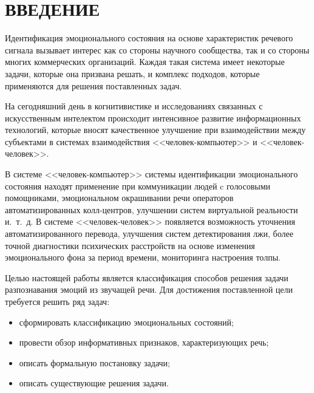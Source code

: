 \chapter*{ВВЕДЕНИЕ}

Идентификация эмоционального состояния на основе характеристик речевого сигнала вызывает интерес как со стороны научного сообщества, так и со стороны многих коммерческих организаций. Каждая такая система имеет некоторые задачи, которые она призвана решать, и комплекс подходов, которые применяются для решения поставленных задач.

На сегодняшний день в когнитивистике и исследованиях связанных с искусственным интелектом происходит интенсивное развитие информационных технологий, которые вносят качественное улучшение при взаимодействии между субъектами в системах взаимодействия <<человек-компьютер>> и <<человек-человек>>. 

В системе <<человек-компьютер>> системы идентификации эмоционального состояния находят применение при коммуникации людей c голосовыми помощниками, эмоциональном окрашивании речи операторов автоматизированных колл-центров, улучшении систем виртуальной реальности и.~т.~д. В системе <<человек-человек>> появляется возможность уточнения автоматизированного перевода, улучшения систем детектирования лжи, более точной диагностики психических расстройств на основе изменения эмоционального фона за период времени, мониторинга настроения толпы.


Целью настоящей работы является классификация способов решения задачи разпознавания эмоций из звучащей речи.
Для достижения поставленной цели требуется решить ряд задач:
\begin{itemize}
	\item сформировать классификацию эмоциональных состояний;
	\item провести обзор информативных признаков, характеризующих речь;
	\item описать формальную постановку задачи;
	\item описать существующие решения задачи.
\end{itemize}


